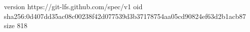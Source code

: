 version https://git-lfs.github.com/spec/v1
oid sha256:0d407dd35ac08c00238f42d077539d3b37178754aa05cd90824ef63d2b1acb87
size 818

